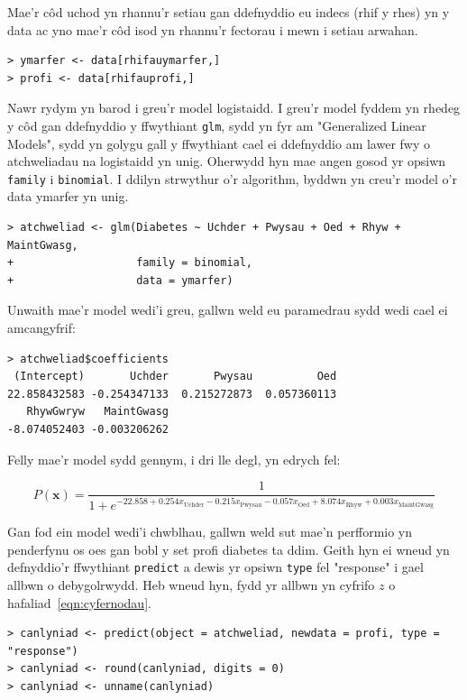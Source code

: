 Mae'r c\^{o}d uchod yn rhannu'r setiau gan ddefnyddio eu indecs (rhif y rhes) yn y data ac yno mae'r c\^{o}d isod yn rhannu'r fectorau i mewn i setiau arwahan. 

\begin{verbatim}
> ymarfer <- data[rhifauymarfer,] 
> profi <- data[rhifauprofi,]
\end{verbatim}

Nawr rydym yn barod i greu'r model logistaidd. I greu'r model fyddem yn rhedeg y c\^{o}d gan ddefnyddio y ffwythiant \texttt{glm}, sydd yn fyr am "Generalized Linear Models", sydd yn golygu gall y ffwythiant cael ei ddefnyddio am lawer fwy o atchweliadau na logistaidd yn unig. Oherwydd hyn mae angen gosod yr opsiwn \texttt{family} i \texttt{binomial}. I ddilyn strwythur o'r algorithm, byddwn yn creu'r model o'r data ymarfer yn unig. 

\begin{verbatim}
> atchweliad <- glm(Diabetes ~ Uchder + Pwysau + Oed + Rhyw + MaintGwasg,
+                   family = binomial,
+                   data = ymarfer)
\end{verbatim}

Unwaith mae'r model wedi'i greu, gallwn weld eu paramedrau sydd wedi cael ei amcangyfrif:

\begin{verbatim}
> atchweliad$coefficients
 (Intercept)       Uchder       Pwysau          Oed 
22.858432583 -0.254347133  0.215272873  0.057360113 
   RhywGwryw   MaintGwasg 
-8.074052403 -0.003206262 
\end{verbatim}

Felly mae'r model sydd gennym, i dri lle degl, yn edrych fel:

$$ P(\mathbf{x}) = \frac{1}{1 + e^{-22.858 + 0.254 x_{\text{Uchder}} - 0.215 x_{\text{Pwysau}} - 0.057 x_{\text{Oed}} + 8.074 x_{\text{Rhyw}} + 0.003 x_{\text{MaintGwasg}}}} $$

Gan fod ein model wedi'i chwblhau, gallwn weld sut mae'n perfformio yn penderfynu os oes gan bobl y set profi diabetes ta ddim. Geith hyn ei wneud yn defnyddio'r ffwythiant \texttt{predict} a dewis yr opsiwn \texttt{type} fel "response" i gael allbwn o debygolrwydd. Heb wneud hyn, fydd yr allbwn yn cyfrifo $z$ o hafaliad~\ref{eqn:cyfernodau}. 

\begin{verbatim}
> canlyniad <- predict(object = atchweliad, newdata = profi, type = "response")
> canlyniad <- round(canlyniad, digits = 0)
> canlyniad <- unname(canlyniad)
\end{verbatim}

